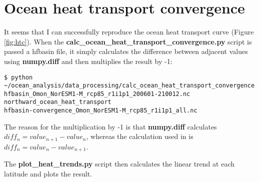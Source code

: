\section{Ocean heat transport convergence}

It seems that I can successfully reproduce the ocean heat transport curve (Figure \ref{fig:htc}). When the \textbf{calc_ocean_heat_transport_convergence.py} script is passed a hfbasin file, it simply calculates the difference between adjacent values using \textbf{numpy.diff} and then multiplies the result by -1:

\begin{verbatim}
$ python ~/ocean_analysis/data_processing/calc_ocean_heat_transport_convergence.py
hfbasin_Omon_NorESM1-M_rcp85_r1i1p1_200601-210012.nc
northward_ocean_heat_transport
hfbasin-convergence_Omon_NorESM1-M_rcp85_r1i1p1_all.nc
\end{verbatim}

The reason for the multiplication by -1 is that \textbf{numpy.diff} calculates $diff_{n} = value_{n+1} - value_{n}$, whereas the calculation used in \citet{Nummelin_2017} is $diff_{n} = value_{n} - value_{n+1}$.    

The \textbf{plot_heat_trends.py} script then calculates the linear trend at each latitude and plots the result. 